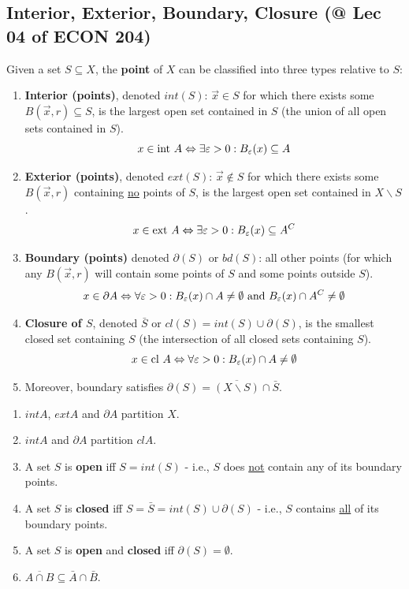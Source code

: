 \documentclass[11pt]{elegantbook}
\begin{document}
\subsection{Interior, Exterior, Boundary, Closure \small{(@ Lec 04 of ECON 204)}}
Given a set $S\subseteq X$, the \textbf{point} of $X$ can be classified into three types relative to $S$:
\begin{enumerate}[$\bullet$]
    \item \textbf{Interior (points)}, denoted $int(S)$: $\vec{x}\in S$ for which there exists some $B(\vec{x},r)\subseteq S$, is the largest open set contained in $S$ (the union of all open sets contained in $S$). $$x\in \textnormal{int }A \Leftrightarrow \exists \varepsilon>0: B_\varepsilon(x)\subseteq A$$
    \item \textbf{Exterior (points)}, denoted $ext(S)$: $\vec{x}\notin S$ for which there exists some $B(\vec{x},r)$ containing \underline{no} points of $S$, is the largest open set contained in $X \backslash S$.
    $$x\in \textnormal{ext }A \Leftrightarrow \exists \varepsilon>0: B_\varepsilon(x)\subseteq A^C$$
    \item \textbf{Boundary (points)} denoted $\partial (S)$ or $bd(S)$: all other points (for which any $B(\vec{x},r)$ will contain some points of $S$ and some points outside $S$).
    $$x\in \partial A \Leftrightarrow \forall \varepsilon>0: B_\varepsilon(x)\cap A\neq\emptyset \textnormal{ and } B_\varepsilon(x)\cap A^C\neq\emptyset$$
    \item \textbf{Closure of $S$}, denoted $\bar{S}$ or $cl(S)=int(S)\cup \partial(S)$,  is the smallest closed set containing $S$ (the intersection of all closed sets containing $S$).
    $$x\in \textnormal{cl }A \Leftrightarrow \forall \varepsilon>0: B_\varepsilon(x)\cap A\neq\emptyset$$
    \item Moreover, boundary satisfies $\partial (S)=\overline{(X\backslash S)}\cap\bar{S}$.
\end{enumerate}

\begin{proposition}
    \begin{enumerate}[(1)]
        \item $int A$, $ext A$ and $\partial A$ partition $X$.
        \item $int A$ and $\partial A$ partition $cl A$.
        \item A set $S$ is \textbf{open} iff $S=int(S)$ - i.e., $S$ does \underline{not} contain any of its boundary points.
        \item A set $S$ is \textbf{closed} iff $S=\bar{S}=int(S)\cup \partial(S)$ - i.e., $S$ contains \underline{all} of its boundary points.
        \item A set $S$ is \textbf{open} and \textbf{closed} iff $\partial(S)=\emptyset$.
        \item $\overline{A\cap B}\subseteq \bar{A}\cap\bar{B}$.
    \end{enumerate}
\end{proposition}
\end{document}

